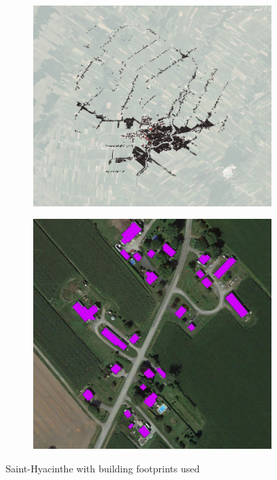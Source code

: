 \documentclass[11pt]{article}
\begin{document}
\begin{figure}[H]
    \centering
    \begin{subfigure}{0.5\textwidth}
        \centering
        \includegraphics[width=\textwidth]{fig2.png}
    \end{subfigure}%
    \hfill
    \begin{subfigure}{0.437\textwidth}
        \centering
        \includegraphics[width=\textwidth]{fig2.2.png}
    \end{subfigure}
    \captionsetup{justification=centering}
    \caption{Saint-Hyacinthe with building footprints used}
    \label{fig:sh}
\end{figure}
\end{document}
